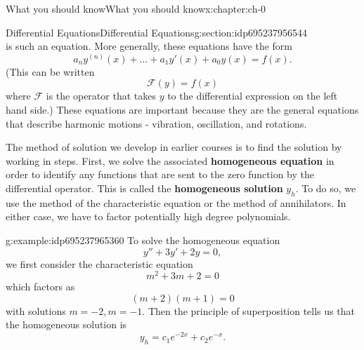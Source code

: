 \documentclass[oneside,10pt,]{book}
\newcommand{\terminology}[1]{\textbf{#1}}
\numberwithin{equation}{section}
\numberwithin{equation}{section}
\begin{document}
\begin{chapterptx}{What you should know}{}{What you should know}{}{}{x:chapter:ch-0}
\begin{sectionptx}{Differential Equations}{}{Differential Equations}{}{}{g:section:idp695237956544}
\begin{equation*}
\end{equation*}
is such an equation. More generally, these equations have the form%
\begin{equation*}
a_n y^{(n)}(x) + \ldots + a_1 y'(x) + a_0 y(x) = f(x).
\end{equation*}
(This can be written%
\begin{equation*}
\mathcal{F}(y) = f(x)
\end{equation*}
where \(\mathcal{F}\) is the operator that takes \(y\) to the differential expression on the left hand side.) These equations are important because they are the general equations that describe harmonic motions - vibration, oscillation, and rotations.%
\par
The method of solution we develop in earlier courses is to find the solution by working in steps. First, we solve the associated \terminology{homogeneous equation} in order to identify any functions that are sent to the zero function by the differential operator. This is called the \terminology{homogeneous solution} \(y_h\). To do so, we use the method of the characteristic equation or the method of annihilators. In either case, we have to factor potentially high degree polynomials.%
\begin{example}{}{g:example:idp695237965360}%
To solve the homogeneous equation%
\begin{equation*}
y'' + 3y' + 2y = 0,
\end{equation*}
we first consider the characteristic equation%
\begin{equation*}
m^2 + 3m + 2 = 0
\end{equation*}
which factors as%
\begin{equation*}
(m+2)(m+1) = 0
\end{equation*}
with solutions \(m = -2, m=-1\). Then the principle of superposition tells us that the homogeneous solution is%
\begin{equation*}
y_h = c_1 e^{-2x} + c_2 e^{-x}.
\end{equation*}
%
\end{example}

\end{sectionptx}
\end{chapterptx}
\end{document}
